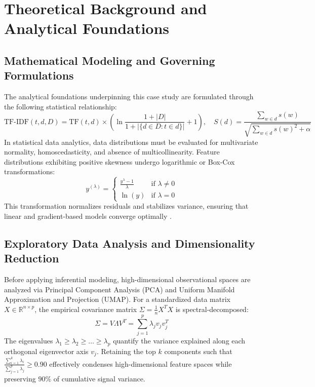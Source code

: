 \section{Theoretical Background and Analytical Foundations}

\subsection{Mathematical Modeling and Governing Formulations}
The analytical foundations underpinning this case study are formulated through the following statistical relationship:
\begin{equation}
  \text{TF-IDF}(t, d, D) = \text{TF}(t, d) \times \left( \ln\frac{1 + |D|}{1 + |\{d \in D : t \in d\}|} + 1 \right), \quad S(d) = \frac{\sum_{w \in d} s(w)}{\sqrt{\sum_{w \in d} s(w)^2 + \alpha}}
\label{eq:core_math}
\end{equation}
In statistical data analytics, data distributions must be evaluated for multivariate normality, homoscedasticity, and absence of multicollinearity. Feature distributions exhibiting positive skewness undergo logarithmic or Box-Cox transformations:
\begin{equation}
  y^{(\lambda)} = \begin{cases} \frac{y^\lambda - 1}{\lambda} & \text{if } \lambda \neq 0 \\ \ln(y) & \text{if } \lambda = 0 \end{cases}
\end{equation}
This transformation normalizes residuals and stabilizes variance, ensuring that linear and gradient-based models converge optimally \cite{wickham2016r}.

\subsection{Exploratory Data Analysis and Dimensionality Reduction}
Before applying inferential modeling, high-dimensional observational spaces are analyzed via Principal Component Analysis (PCA) and Uniform Manifold Approximation and Projection (UMAP). For a standardized data matrix $X \in \mathbb{R}^{n \times p}$, the empirical covariance matrix $\Sigma = \frac{1}{n} X^T X$ is spectral-decomposed:
\begin{equation}
  \Sigma = V \Lambda V^T = \sum_{j=1}^p \lambda_j v_j v_j^T
\end{equation}
The eigenvalues $\lambda_1 \ge \lambda_2 \ge \dots \ge \lambda_p$ quantify the variance explained along each orthogonal eigenvector axis $v_j$. Retaining the top $k$ components such that $\frac{\sum_{i=1}^k \lambda_i}{\sum_{j=1}^p \lambda_j} \ge 0.90$ effectively condenses high-dimensional feature spaces while preserving $90\%$ of cumulative signal variance.


